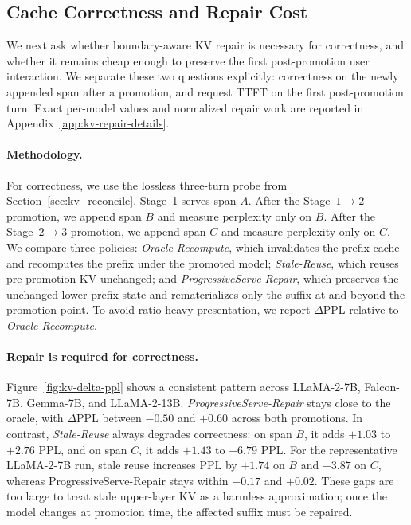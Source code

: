 \subsection{Cache Correctness and Repair Cost}
\label{sec:eval-kv}

We next ask whether boundary-aware KV repair is necessary for correctness, and whether it remains cheap enough to preserve the first post-promotion user interaction. We separate these two questions explicitly: correctness on the newly appended span after a promotion, and request TTFT on the first post-promotion turn. Exact per-model values and normalized repair work are reported in Appendix~\ref{app:kv-repair-details}.

\paragraph{Methodology.}
For correctness, we use the lossless three-turn probe from Section~\ref{sec:kv_reconcile}. Stage~1 serves span \(A\). After the Stage~\(1\!\rightarrow\!2\) promotion, we append span \(B\) and measure perplexity only on \(B\). After the Stage~\(2\!\rightarrow\!3\) promotion, we append span \(C\) and measure perplexity only on \(C\). We compare three policies: \textit{Oracle-Recompute}, which invalidates the prefix cache and recomputes the prefix under the promoted model; \textit{Stale-Reuse}, which reuses pre-promotion KV unchanged; and \textit{ProgressiveServe-Repair}, which preserves the unchanged lower-prefix state and rematerializes only the suffix at and beyond the promotion point. To avoid ratio-heavy presentation, we report \(\Delta\)PPL relative to \textit{Oracle-Recompute}.

\paragraph{Repair is required for correctness.}
Figure~\ref{fig:kv-delta-ppl} shows a consistent pattern across LLaMA-2-7B, Falcon-7B, Gemma-7B, and LLaMA-2-13B. \textit{ProgressiveServe-Repair} stays close to the oracle, with \(\Delta\)PPL between \(-0.50\) and \(+0.60\) across both promotions. In contrast, \textit{Stale-Reuse} always degrades correctness: on span \(B\), it adds \(+1.03\) to \(+2.76\) PPL, and on span \(C\), it adds \(+1.43\) to \(+6.79\) PPL. For the representative LLaMA-2-7B run, stale reuse increases PPL by \(+1.74\) on \(B\) and \(+3.87\) on \(C\), whereas ProgressiveServe-Repair stays within \(-0.17\) and \(+0.02\). These gaps are too large to treat stale upper-layer KV as a harmless approximation; once the model changes at promotion time, the affected suffix must be repaired.

